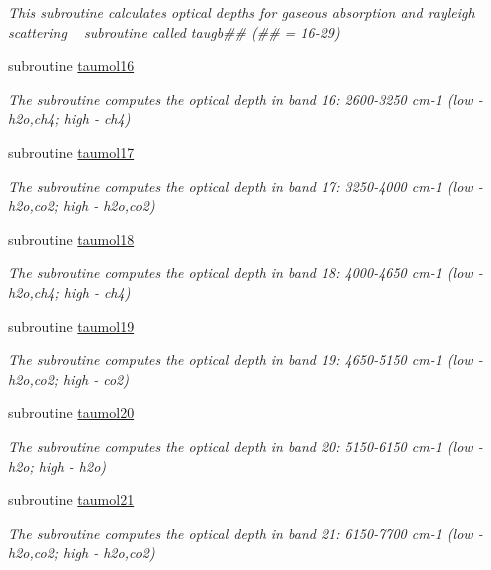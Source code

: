 \begin{DoxyCompactItemize}
\begin{DoxyCompactList}\small\item\em This subroutine calculates optical depths for gaseous absorption and rayleigh scattering ~\newline
 subroutine called taugb\#\# (\#\# = 16-\/29) \end{DoxyCompactList}\item 
subroutine \hyperlink{radsw__main_8f_a8702f5f6285ff1a5cbfad740545fffb6}{taumol16}
\begin{DoxyCompactList}\small\item\em The subroutine computes the optical depth in band 16\+: 2600-\/3250 cm-\/1 (low -\/ h2o,ch4; high -\/ ch4) \end{DoxyCompactList}\item 
subroutine \hyperlink{radsw__main_8f_ae46d1c061726bcde426caadd80b1fd80}{taumol17}
\begin{DoxyCompactList}\small\item\em The subroutine computes the optical depth in band 17\+: 3250-\/4000 cm-\/1 (low -\/ h2o,co2; high -\/ h2o,co2) \end{DoxyCompactList}\item 
subroutine \hyperlink{radsw__main_8f_a06f6f2b0ef60df93c267a667a2e1aa36}{taumol18}
\begin{DoxyCompactList}\small\item\em The subroutine computes the optical depth in band 18\+: 4000-\/4650 cm-\/1 (low -\/ h2o,ch4; high -\/ ch4) \end{DoxyCompactList}\item 
subroutine \hyperlink{radsw__main_8f_a776a0d78fda9f4fd0f1153b55be597df}{taumol19}
\begin{DoxyCompactList}\small\item\em The subroutine computes the optical depth in band 19\+: 4650-\/5150 cm-\/1 (low -\/ h2o,co2; high -\/ co2) \end{DoxyCompactList}\item 
subroutine \hyperlink{radsw__main_8f_a6eb9a29728a986ea6b15240adebd4a0c}{taumol20}
\begin{DoxyCompactList}\small\item\em The subroutine computes the optical depth in band 20\+: 5150-\/6150 cm-\/1 (low -\/ h2o; high -\/ h2o) \end{DoxyCompactList}\item 
subroutine \hyperlink{radsw__main_8f_a54619c48147f35da2d7855dc488c0ff4}{taumol21}
\begin{DoxyCompactList}\small\item\em The subroutine computes the optical depth in band 21\+: 6150-\/7700 cm-\/1 (low -\/ h2o,co2; high -\/ h2o,co2) \end{DoxyCompactList}\item 

\end{DoxyCompactItemize}
